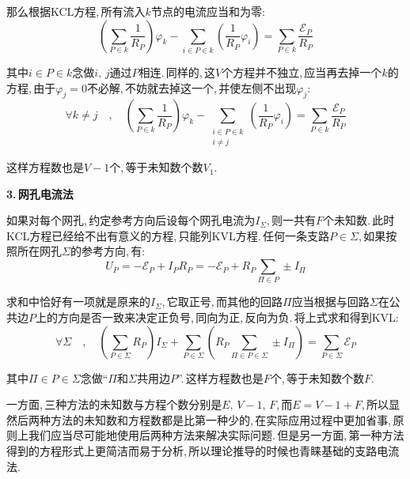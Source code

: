 那么根据KCL方程,\,所有流入$k$节点的电流应当和为零:
\[\left(\sum_{P\in k}\frac{1}{R_P}\right)\varphi_k-\sum_{i\in P\in k}\left(\frac{1}{R_P}\varphi_i\right)=\sum_{P\in k}\frac{\mathscr{E}_P}{R_P}\]

其中$i\in P\in k$念做$i,\,j通过P相连$.\,同样的,\,这$V$个方程并不独立,\,应当再去掉一个$k$的方程,\,由于$\varphi_j=0$不必解,\,不妨就去掉这一个,\,并使左侧不出现$\varphi_j$:
\[\forall k\neq j\quad ,\quad \left(\sum_{P\in k}\frac{1}{R_P}\right)\varphi_k-\sum_{\substack{i\in P\in k\\ i\neq j}}\left(\frac{1}{R_P}\varphi_i\right)=\sum_{P\in k}\frac{\mathscr{E}_P}{R_P}\]

这样方程数也是$V-1$个,\,等于未知数个数$V_1$.

\vspace{0.2cm}
\textbf{3.\,网孔电流法}
\vspace{0.2cm}

如果对每个网孔,\,约定参考方向后设每个网孔电流为$I_\Sigma$,\,则一共有$F$个未知数.\,此时KCL方程已经给不出有意义的方程,\,只能列KVL方程.\,任何一条支路$P\in \Sigma$,\,如果按照所在网孔$\Sigma$的参考方向,\,有:
\[U_P=-\mathscr{E}_P+I_PR_P=-\mathscr{E}_P+R_P\sum_{\Pi \in P}\pm I_\Pi\]

求和中恰好有一项就是原来的$I_\Sigma$,\,它取正号,\,而其他的回路$\Pi$应当根据与回路$\Sigma$在公共边$P$上的方向是否一致来决定正负号,\,同向为正,\,反向为负.\,将上式求和得到KVL:
\[\forall \Sigma\quad ,\quad \left(\sum_{P\in\Sigma}R_P\right)I_\Sigma+\sum_{P\in\Sigma}\left(R_P\sum_{\Pi \in P\in \Sigma}\pm I_\Pi\right)=\sum_{P\in\Sigma}\mathscr{E}_P \]

其中$\Pi \in P\in \Sigma$念做``$\Pi$和$\Sigma$共用边$P$''.\,这样方程数也是$F$个,\,等于未知数个数$F$.

\vspace{0.5cm}

一方面,\,三种方法的未知数与方程个数分别是$E,\,V-1,\,F$,\,而$E=V-1+F$,\,所以显然后两种方法的未知数和方程数都是比第一种少的,\,在实际应用过程中更加省事,\,原则上我们应当尽可能地使用后两种方法来解决实际问题.\,但是另一方面,\,第一种方法得到的方程形式上更简洁而易于分析,\,所以理论推导的时候也青睐基础的支路电流法.



